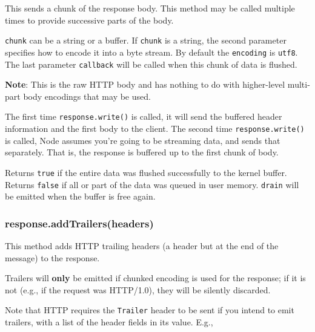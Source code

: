 This sends a chunk of the response body. This method may be called
multiple times to provide successive parts of the body.

\texttt{chunk} can be a string or a buffer. If \texttt{chunk} is a
string, the second parameter specifies how to encode it into a byte
stream. By default the \texttt{encoding} is
\texttt{\textquotesingle{}utf8\textquotesingle{}}. The last parameter
\texttt{callback} will be called when this chunk of data is flushed.

\textbf{Note}: This is the raw HTTP body and has nothing to do with
higher-level multi-part body encodings that may be used.

The first time \texttt{response.write()} is called, it will send the
buffered header information and the first body to the client. The second
time \texttt{response.write()} is called, Node assumes you're going to
be streaming data, and sends that separately. That is, the response is
buffered up to the first chunk of body.

Returns \texttt{true} if the entire data was flushed successfully to the
kernel buffer. Returns \texttt{false} if all or part of the data was
queued in user memory.
\texttt{\textquotesingle{}drain\textquotesingle{}} will be emitted when
the buffer is free again.

\subsubsection{response.addTrailers(headers)}\label{response.addtrailersheaders}

This method adds HTTP trailing headers (a header but at the end of the
message) to the response.

Trailers will \textbf{only} be emitted if chunked encoding is used for
the response; if it is not (e.g., if the request was HTTP/1.0), they
will be silently discarded.

Note that HTTP requires the \texttt{Trailer} header to be sent if you
intend to emit trailers, with a list of the header fields in its value.
E.g.,

\begin{Shaded}
\begin{Highlighting}[]
\NormalTok{(}\NormalTok{, \{ }\NormalTok{: }\NormalTok{,}
                          \NormalTok{: } \NormalTok{\});}
\NormalTok{(\{}\NormalTok{: }\NormalTok{\});}
\NormalTok{();}
\end{Highlighting}
\end{Shaded}

